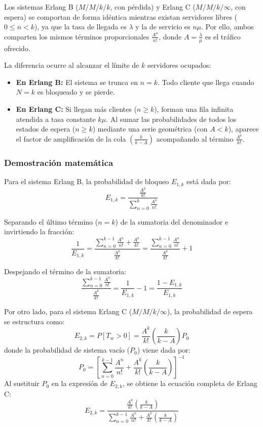 \documentclass[11pt, a4paper]{article}
\begin{document}
Los sistemas Erlang B ($M/M/k/k$, con pérdida) y Erlang C ($M/M/k/\infty$, con espera) se comportan de forma idéntica mientras existan servidores libres ($0 \le n < k$), ya que la tasa de llegada es $\lambda$ y la de servicio es $n\mu$. Por ello, ambos comparten los mismos términos proporcionales $\frac{A^n}{n!}$, donde $A = \frac{\lambda}{\mu}$ es el tráfico ofrecido.

La diferencia ocurre al alcanzar el límite de $k$ servidores ocupados:
\begin{itemize}
    \item \textbf{En Erlang B:} El sistema se trunca en $n = k$. Todo cliente que llega cuando $N = k$ es bloqueado y se pierde.
    \item \textbf{En Erlang C:} Si llegan más clientes ($n \ge k$), forman una fila infinita atendida a tasa constante $k\mu$. Al sumar las probabilidades de todos los estados de espera ($n \ge k$) mediante una serie geométrica (con $A < k$), aparece el factor de amplificación de la cola $\left(\frac{k}{k - A}\right)$ acompañando al término $\frac{A^k}{k!}$.
\end{itemize}

\subsubsection{Demostración matemática}

Para el sistema Erlang B, la probabilidad de bloqueo $E_{1,k}$ está dada por:
\[
E_{1,k} = \frac{\frac{A^k}{k!}}{\sum\limits_{n=0}^{k} \frac{A^n}{n!}}
\]

Separando el último término ($n = k$) de la sumatoria del denominador e invirtiendo la fracción:
\[
\frac{1}{E_{1,k}} = \frac{\sum\limits_{n=0}^{k-1} \frac{A^n}{n!} + \frac{A^k}{k!}}{\frac{A^k}{k!}} = \frac{\sum\limits_{n=0}^{k-1} \frac{A^n}{n!}}{\frac{A^k}{k!}} + 1
\]

Despejando el término de la sumatoria:
\begin{equation}
\frac{\sum\limits_{n=0}^{k-1} \frac{A^n}{n!}}{\frac{A^k}{k!}} = \frac{1}{E_{1,k}} - 1 = \frac{1 - E_{1,k}}{E_{1,k}}
\label{eq:sumatoria_erlangB}
\end{equation}

Por otro lado, para el sistema Erlang C ($M/M/k/\infty$), la probabilidad de espera se estructura como:
\[
E_{2,k} = P[T_w > 0] = \frac{A^k}{k!} \left( \frac{k}{k - A} \right) P_0
\]
donde la probabilidad de sistema vacío ($P_0$) viene dada por:
\[
P_0 = \left[ \sum\limits_{n=0}^{k-1} \frac{A^n}{n!} + \frac{A^k}{k!} \left( \frac{k}{k - A} \right) \right]^{-1}
\]
Al sustituir $P_0$ en la expresión de $E_{2,k}$, se obtiene la ecuación completa de Erlang C:
\[
E_{2,k} = \frac{\frac{A^k}{k!} \left(\frac{k}{k - A}\right)}{\sum\limits_{n=0}^{k-1} \frac{A^n}{n!} + \frac{A^k}{k!} \left(\frac{k}{k - A}\right)}
\]
\end{document}
